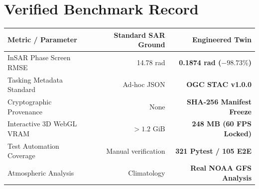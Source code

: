 \documentclass[10pt,letterpaper]{article}
\begin{document}
\begin{minipage}[t]{0.51\textwidth}
    \section*{Verified Benchmark Record}
    \footnotesize
    \begin{tabularx}{\linewidth}{X r r}
        \toprule
        \textbf{Metric / Parameter} & \textbf{Standard SAR Ground} & \textbf{Engineered Twin} \\
        \midrule
        InSAR Phase Screen RMSE & 14.78 rad & \textbf{0.1874 rad ($-98.73\%$)} \\
        Tasking Metadata Standard & Ad-hoc JSON & \textbf{OGC STAC v1.0.0} \\
        Cryptographic Provenance & None & \textbf{SHA-256 Manifest Freeze} \\
        Interactive 3D WebGL VRAM & $> 1.2\text{ GiB}$ & \textbf{248 MB (60 FPS Locked)} \\
        Test Automation Coverage & Manual verification & \textbf{321 Pytest / 105 E2E} \\
        Atmospheric Analysis & Climatology & \textbf{Real NOAA GFS Analysis} \\
        \bottomrule
    \end{tabularx}
\end{minipage}
\hfill
\end{document}
